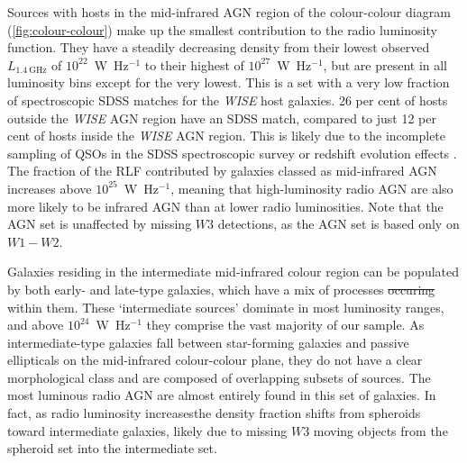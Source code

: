\documentclass[11pt, a4paper]{book}
\providecommand{\DIFaddtex}[1]{{\protect\color{blue}\uwave{#1}}} %
\providecommand{\DIFdeltex}[1]{{\protect\color{red}\sout{#1}}}                      %
\providecommand{\DIFaddbegin}{} %
\providecommand{\DIFaddend}{} %
\providecommand{\DIFdelbegin}{} %
\providecommand{\DIFdelend}{} %
\providecommand{\DIFadd}[1]{\texorpdfstring{\DIFaddtex{#1}}{#1}} %
\providecommand{\DIFdel}[1]{\texorpdfstring{\DIFdeltex{#1}}{}} %
\newcommand{\DIFscaledelfig}{0.5}
\newlength{\DIFdelgraphicswidth} %
\newlength{\DIFdelgraphicsheight} %
\newcommand{\DIFaddincludegraphics}[2][]{{\color{blue}\fbox{\DIFOincludegraphics[#1]{#2}}}} %
\newcommand{\DIFdelincludegraphics}[2][]{%
\sbox{\DIFdelgraphicsbox}{\DIFOincludegraphics[#1]{#2}}%
\settoboxwidth{\DIFdelgraphicswidth}{\DIFdelgraphicsbox} %
\settoboxtotalheight{\DIFdelgraphicsheight}{\DIFdelgraphicsbox} %
\scalebox{\DIFscaledelfig}{%
\parbox[b]{\DIFdelgraphicswidth}{\usebox{\DIFdelgraphicsbox}\\[-\baselineskip] \rule{\DIFdelgraphicswidth}{0em}}\llap{\resizebox{\DIFdelgraphicswidth}{\DIFdelgraphicsheight}{%
\setlength{\unitlength}{\DIFdelgraphicswidth}%
\begin{picture}(1,1)%
\thicklines\linethickness{2pt} %
{\color[rgb]{1,0,0}\put(0,0){\framebox(1,1){}}}%
{\color[rgb]{1,0,0}\put(0,0){\line( 1,1){1}}}%
{\color[rgb]{1,0,0}\put(0,1){\line(1,-1){1}}}%
\end{picture}%
}\hspace*{3pt}}} %
} %
\DeclareRobustCommand{\DIFaddbegin}{\DIFOaddbegin \let\includegraphics\DIFaddincludegraphics} %
\DeclareRobustCommand{\DIFaddend}{\DIFOaddend \let\includegraphics\DIFOincludegraphics} %
\DeclareRobustCommand{\DIFdelbegin}{\DIFOdelbegin \let\includegraphics\DIFdelincludegraphics} %
\DeclareRobustCommand{\DIFdelend}{\DIFOaddend \let\includegraphics\DIFOincludegraphics} %
\begin{document}
      Sources with hosts in the mid-infrared AGN region of the colour-colour diagram (\autoref{fig:colour-colour}) make
      up the smallest contribution to the radio luminosity function. They have
      a steadily decreasing density from their lowest observed $L_{1.4\ \mathrm{GHz}}$ of $10^{22}$~W~Hz$^{-1}$ to their highest of
      $10^{27}$~W~Hz$^{-1}$, but are present in all luminosity bins except for
      the very lowest. This is a set with a very low fraction of spectroscopic SDSS matches for the \emph{WISE} host galaxies. 26 per cent of
      hosts outside the \emph{WISE} AGN region have an SDSS match, compared to just 12 per
      cent of hosts inside the \emph{WISE} AGN region. This is likely due to the incomplete sampling of QSOs in the SDSS spectroscopic survey or redshift evolution effects \citep{strauss02sdss}. The fraction of the RLF contributed by galaxies classed as mid-infrared AGN increases above $10^{25}$~W~Hz$^{-1}$, meaning that high-luminosity radio AGN are also more likely to be infrared AGN than at lower radio luminosities. Note that the AGN set is unaffected by missing $W3$ detections, as the AGN set is based only on $W1-W2$.

      Galaxies residing in the intermediate mid-infrared colour region can be
      populated by both early- and late-type galaxies, which have a mix of
      processes \DIFdelbegin \DIFdel{occuring }\DIFdelend \DIFaddbegin \DIFadd{occurring }\DIFaddend within them. These `intermediate sources' dominate in
      most luminosity ranges, and above $10^{24}$~W~Hz$^{-1}$ they comprise the
      vast majority of our sample. As intermediate-type galaxies fall between
      star-forming galaxies and passive ellipticals on the mid-infrared colour-colour plane, they do
      not have a clear morphological class and are composed of overlapping subsets of sources. The most luminous radio AGN are almost entirely found in
      this set of galaxies. In fact, as radio luminosity increases\DIFaddbegin \DIFadd{, }\DIFaddend the density
      fraction shifts from spheroids toward intermediate galaxies, likely due to missing $W3$ moving objects from the spheroid set into the intermediate set.
\end{document}
